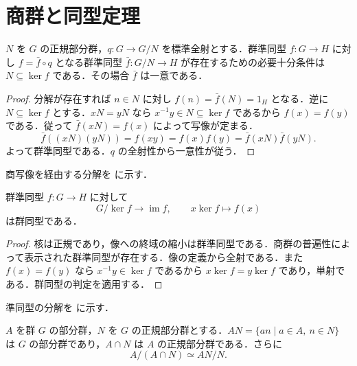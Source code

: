 \section{商群と同型定理}
\begin{thm}[商群の普遍性]
$N$ を $G$ の正規部分群，$q:G\to G/N$ を標準全射とする．群準同型 $f:G\to H$ に対し $f=\bar f\circ q$ となる群準同型 $\bar f:G/N\to H$ が存在するための必要十分条件は $N\subseteq\ker f$ である．その場合 $\bar f$ は一意である．
\end{thm}
\begin{proof}
分解が存在すれば $n\in N$ に対し $f(n)=\bar f(N)=1_H$ となる．逆に $N\subseteq\ker f$ とする．$xN=yN$ なら $x^{-1}y\in N\subseteq\ker f$ であるから $f(x)=f(y)$ である．従って $\bar f(xN)=f(x)$ によって写像が定まる．
\[
 \bar f((xN)(yN))=f(xy)=f(x)f(y)=\bar f(xN)\bar f(yN).
\]
よって群準同型である．$q$ の全射性から一意性が従う．
\end{proof}
商写像を経由する分解を  に示す．
\begin{thm}[第一同型定理]
群準同型 $f:G\to H$ に対して
\[
 G/\ker f \longrightarrow \operatorname{im}f,\qquad
 x\ker f\longmapsto f(x)
\]
は群同型である．
\end{thm}
\begin{proof}
核は正規であり，像への終域の縮小は群準同型である．商群の普遍性によって表示された群準同型が存在する．像の定義から全射である．また $f(x)=f(y)$ なら $x^{-1}y\in\ker f$ であるから $x\ker f=y\ker f$ であり，単射である．群同型の判定を適用する．
\end{proof}
準同型の分解を  に示す．
\begin{thm}[第二同型定理]
$A$ を群 $G$ の部分群，$N$ を $G$ の正規部分群とする．$AN=\{an\mid a\in A,\ n\in N\}$ は $G$ の部分群であり，$A\cap N$ は $A$ の正規部分群である．さらに
\[
 A/(A\cap N)\simeq AN/N .
\]
\end{thm}

